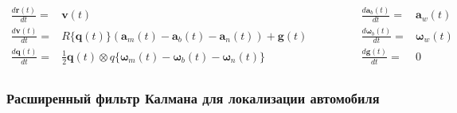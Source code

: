 \documentclass[12pt]{article}
\begin{document}
\begin{equation}
    \begin{aligned}
        \frac{d \pmb{r}(t)}{d t}= & \pmb{v}(t)                                                                \\
        \frac{d \pmb{v}(t)}{d t}= & R\{\pmb{q}(t)\} (\pmb{a}_m(t) - \pmb{a}_b(t) - \pmb{a}_n(t)) + \pmb{g}(t) \\
        \frac{d \pmb{q}(t)}{d t}= & \frac{1}{2} \pmb{q}(t) \otimes q\{
        \pmb{\omega}_m(t) - \pmb{\omega}_b(t) - \pmb{\omega}_n(t)
        \}                                                                                                    \\
    \end{aligned}
    \qquad\qquad
    \begin{aligned}
        \frac{d \pmb{a}_b(t)}{d t}=      & \pmb{a}_w(t)      \\
        \frac{d \pmb{\omega}_b(t)}{d t}= & \pmb{\omega}_w(t) \\
        \frac{d \pmb{g}(t)}{d t}=        & 0                 \\
    \end{aligned}
\end{equation}

\subsubsection{Расширенный фильтр Калмана для локализации автомобиля}
\label{SubsubsectionExtendedKalmanFilterForLocalization}
\end{document}
